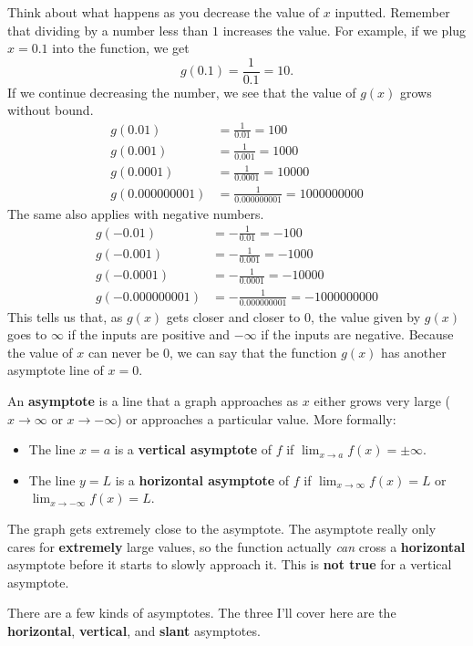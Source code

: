 Think about what happens as you decrease the value of $x$ inputted. Remember that dividing by a number less than $1$ increases the value. For example, if we plug $x = 0.1$ into the function, we get
\[
    g(0.1) = \frac{1}{0.1} = 10 \text{.}
\]
If we continue decreasing the number, we see that the value of $g(x)$ grows without bound.
\[
\begin{aligned}
    g(0.01) &= \frac{1}{0.01} = 100 \\
    g(0.001) &= \frac{1}{0.001} = 1000 \\
    g(0.0001) &= \frac{1}{0.0001} = 10000 \\
    g(0.000000001) &= \frac{1}{0.000000001} = 1000000000
\end{aligned}
\]
The same also applies with negative numbers.
\[
\begin{aligned}
    g(-0.01) &= -\frac{1}{0.01} = -100 \\
    g(-0.001) &= -\frac{1}{0.001} = -1000 \\
    g(-0.0001) &= -\frac{1}{0.0001} = -10000 \\
    g(-0.000000001) &= -\frac{1}{0.000000001} = -1000000000
\end{aligned}
\]
This tells us that, as $g(x)$ gets closer and closer to $0$, the value given by $g(x)$ goes to $\infty$ if the inputs are positive and $-\infty$ if the inputs are negative. Because the value of $x$ can never be $0$, we can say that the function $g(x)$ has another asymptote line of $x = 0$.
\begin{definition}
    An \textbf{asymptote} is a line that a graph approaches as $x$ either grows very large ($x \to \infty$ or $x \to -\infty$) or approaches a particular value. More formally:
    \begin{itemize}
        \item The line $x = a$ is a \textbf{vertical asymptote} of $f$ if $\displaystyle \lim_{x \to a} f(x) = \pm\infty$.
        \item The line $y = L$ is a \textbf{horizontal asymptote} of $f$ if $\displaystyle \lim_{x \to \infty} f(x) = L$ or $\displaystyle \lim_{x \to -\infty} f(x) = L$.
    \end{itemize}
    The graph gets extremely close to the asymptote. The asymptote really only cares for \textbf{extremely} large values, so the function actually \textit{can} cross a \textbf{horizontal} asymptote before it starts to slowly approach it. This is \textbf{not true} for a vertical asymptote.
\end{definition}

There are a few kinds of asymptotes. The three I'll cover here are the \textbf{horizontal}, \textbf{vertical}, and \textbf{slant} asymptotes.